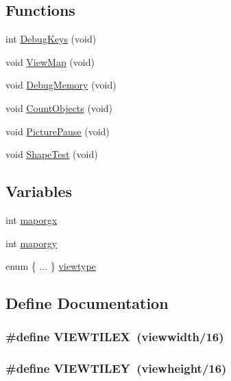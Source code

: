 \subsection*{Functions}
\begin{DoxyCompactItemize}
\item 
int \hyperlink{WL__DEBUG_8C_ae61234b6d03ca70ebed1f5a423d17ba5}{DebugKeys} (void)
\item 
void \hyperlink{WL__DEBUG_8C_a8d87c0ce658aedaf268900bb0638f931}{ViewMap} (void)
\item 
void \hyperlink{WL__DEBUG_8C_a5d1644a9390130b32a7ec37c6aaa7f37}{DebugMemory} (void)
\item 
void \hyperlink{WL__DEBUG_8C_ab9152a6602faeb55c8da615da9e8befd}{CountObjects} (void)
\item 
void \hyperlink{WL__DEBUG_8C_a98df47014d2079dafa7b7b0911bef3ff}{PicturePause} (void)
\item 
void \hyperlink{WL__DEBUG_8C_a0c4cc614683ec32e9c6d2ddd544a77ea}{ShapeTest} (void)
\end{DoxyCompactItemize}
\subsection*{Variables}
\begin{DoxyCompactItemize}
\item 
int \hyperlink{WL__DEBUG_8C_a27e43aecdefe2c697d1e0a97192c21dc}{maporgx}
\item 
int \hyperlink{WL__DEBUG_8C_a4b59524a68e247d43cf291393d7fea9d}{maporgy}
\item 
enum  \{ ... \}  \hyperlink{WL__DEBUG_8C_a90350393f1f20314966dc81ca8d9511c}{viewtype}
\end{DoxyCompactItemize}


\subsection{Define Documentation}
\hypertarget{WL__DEBUG_8C_a77945c3643f65749c3d8cd087cb85eed}{
\subsubsection[{VIEWTILEX}]{\setlength{\rightskip}{0pt plus 5cm}\#define VIEWTILEX~({\bf viewwidth}/16)}}
\label{WL__DEBUG_8C_a77945c3643f65749c3d8cd087cb85eed}
\hypertarget{WL__DEBUG_8C_a288430a87bfe2090e84963840519a619}{
\subsubsection[{VIEWTILEY}]{\setlength{\rightskip}{0pt plus 5cm}\#define VIEWTILEY~({\bf viewheight}/16)}}
\label{WL__DEBUG_8C_a288430a87bfe2090e84963840519a619}


